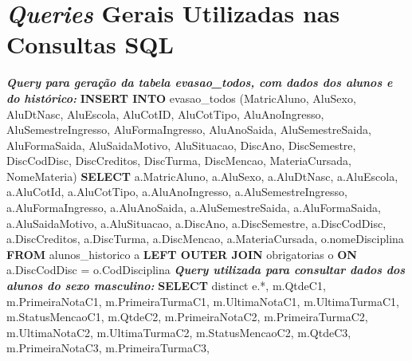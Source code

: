 \chapter{\textit{Queries} Gerais Utilizadas nas Consultas SQL}  \label{apendiceD}


\noindent \textbf{\textit{Query para geração da tabela \textit{evasao\_todos}, com dados dos alunos e do histórico:}}
\newline
\newline
\textbf{INSERT INTO} evasao\_todos (MatricAluno, AluSexo, AluDtNasc, AluEscola, \newline 
AluCotID, AluCotTipo, AluAnoIngresso, AluSemestreIngresso,
AluFormaIngresso,  \newline 
AluAnoSaida, AluSemestreSaida, AluFormaSaida, AluSaidaMotivo, \newline 
AluSituacao, DiscAno, DiscSemestre,
DiscCodDisc, DiscCreditos, \newline
DiscTurma, DiscMencao, MateriaCursada, NomeMateria) \newline 
\textbf{SELECT} a.MatricAluno, a.AluSexo, a.AluDtNasc, a.AluEscola, a.AluCotId, a.AluCotTipo, \newline a.AluAnoIngresso, a.AluSemestreIngresso,
a.AluFormaIngresso, a.AluAnoSaida, \newline
a.AluSemestreSaida, a.AluFormaSaida, a.AluSaidaMotivo, a.AluSituacao, a.DiscAno, \newline
a.DiscSemestre, a.DiscCodDisc, a.DiscCreditos, a.DiscTurma, a.DiscMencao, \newline
a.MateriaCursada, o.nomeDisciplina \newline
\textbf{FROM} alunos\_historico a \newline
\textbf{LEFT OUTER JOIN} obrigatorias o \textbf{ON} a.DiscCodDisc = o.CodDisciplina
\newline
\newline
\newline
\textbf{\textit{Query utilizada para consultar dados dos alunos do sexo masculino:}}
\newline
\newline
\noindent \textbf{SELECT} distinct e.*, \newline
m.QtdeC1, m.PrimeiraNotaC1, m.PrimeiraTurmaC1, 
m.UltimaNotaC1, m.UltimaTurmaC1, m.StatusMencaoC1, \newline
m.QtdeC2, m.PrimeiraNotaC2, m.PrimeiraTurmaC2,
m.UltimaNotaC2, m.UltimaTurmaC2, m.StatusMencaoC2, \newline
m.QtdeC3, m.PrimeiraNotaC3, m.PrimeiraTurmaC3, 
